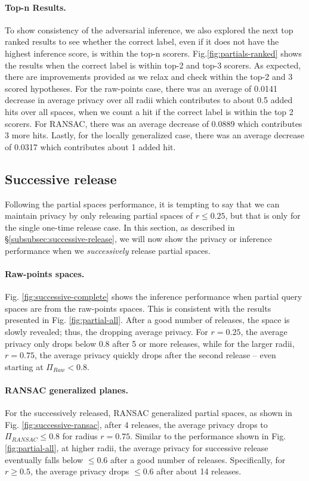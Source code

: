 \paragraph{Top-n Results.}To show consistency of the adversarial inference, we also explored the next top ranked results to see whether the correct label, even if it does not have the highest inference score, is within the top-n scorers. Fig.\ref{fig:partials-ranked} shows the results when the correct label is within top-2 and top-3 scorers. As expected, there are improvements provided as we relax and check within the top-2 and 3 scored hypotheses. For the raw-points case, there was an average of 0.0141 decrease in average privacy over all radii which contributes to about 0.5 added hits over all spaces, when we count a hit if the correct label is within the top 2 scorers. For RANSAC, there was an average decrease of 0.0889 which contributes 3 more hits. Lastly, for the locally generalized case, there was an average decrease of 0.0317 which contributes about 1 added hit.

\subsection{Successive release}\label{subsec:inference-successive}
Following the partial spaces performance, it is tempting to say that we can maintain privacy by only releasing partial spaces of $r\leq 0.25$, but that is only for the single one-time release case. In this section, as described in \S\ref{subsubsec:successive-release}, we will now show the privacy or inference performance when we \textit{successively} release partial spaces. %


\paragraph{Raw-points spaces.} Fig. \ref{fig:successive-complete} shows the inference performance when partial query spaces are from the raw-points spaces. This is consistent with the results presented in Fig. \ref{fig:partial-all}. After a good number of releases, the space is slowly revealed; thus, the dropping average privacy. For $r = 0.25$, the average privacy only drops below 0.8 after 5 or more releases, while for the larger radii, $r = 0.75$, the average privacy quickly drops after the second release -- even starting at $\Pi_{Raw}< 0.8$.

\paragraph{RANSAC generalized planes.} For the successively released, RANSAC generalized partial spaces, as shown in Fig. \ref{fig:successive-ransac}, after 4 releases, the average privacy drops to $\Pi_{RANSAC}\leq 0.8$ for radius $r = 0.75$. Similar to the performance shown in Fig. \ref{fig:partial-all}, at higher radii, the average privacy for successive release eventually falls below $\le 0.6$ after a good number of releases. Specifically, for $r \geq 0.5$, the average privacy drops $\leq 0.6$ after about 14 releases.

